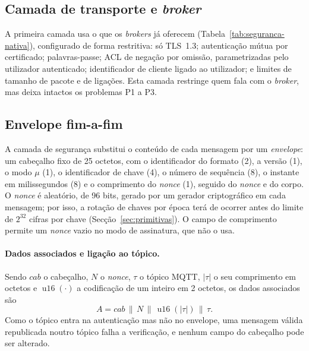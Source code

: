 \subsection{Camada de transporte e \emph{broker}}

A primeira camada usa o que os \emph{brokers} já oferecem
(Tabela~\ref{tab:seguranca-nativa}), configurado de forma restritiva: só TLS~1.3;
autenticação mútua por certificado; palavras-passe; ACL de negação por omissão,
parametrizadas pelo utilizador autenticado; identificador de cliente ligado ao
utilizador;
e limites de tamanho de pacote e de ligações. Esta camada restringe quem fala com o
\emph{broker}, mas deixa intactos os problemas P1 a P3.

\subsection{Envelope fim-a-fim}
\label{sec:envelope}

A camada de segurança substitui o conteúdo de cada mensagem por um
\emph{envelope}: um cabeçalho fixo de 25 octetos, com o identificador do formato (2),
a versão (1), o modo $\mu$ (1), o identificador de chave (4), o número de sequência
(8), o instante em milissegundos (8) e o comprimento do \emph{nonce} (1), seguido do
\emph{nonce} e do corpo. O \emph{nonce} é aleatório, de 96 bits, gerado por um
gerador criptográfico em cada mensagem; por isso, a rotação de chaves por época terá de
ocorrer antes do limite de $2^{32}$ cifras por chave (Secção~\ref{sec:primitivas}). O
campo de comprimento permite um \emph{nonce} vazio no modo de assinatura, que não o
usa.

\paragraph{Dados associados e ligação ao tópico.} Sendo $\mathit{cab}$ o cabeçalho,
$N$ o \emph{nonce}, $\tau$ o tópico MQTT, $|\tau|$ o seu comprimento em octetos e
$\operatorname{u16}(\cdot)$ a codificação de um inteiro em 2 octetos, os dados
associados são
\begin{equation}
  A = \mathit{cab} \,\|\, N \,\|\, \operatorname{u16}(|\tau|) \,\|\, \tau .
  \label{eq:aad}
\end{equation}
Como o tópico entra na autenticação mas não no envelope, uma mensagem válida
republicada noutro tópico falha a verificação, e nenhum campo do cabeçalho pode ser
alterado.

